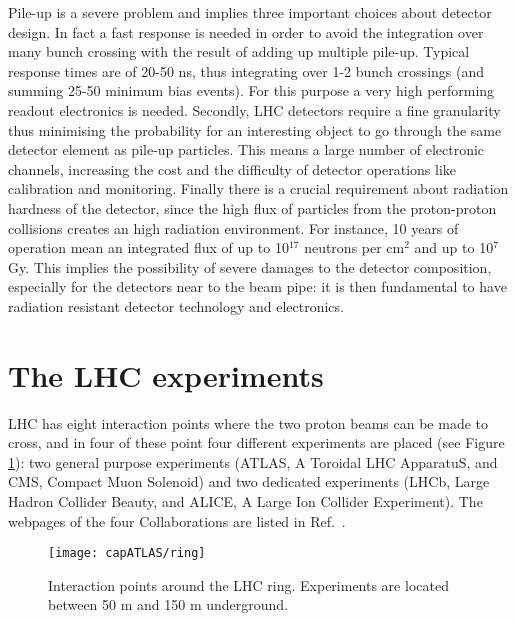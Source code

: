 Pile-up is a severe problem and implies three important choices about detector design. In fact a fast response is needed in order to avoid the integration over many bunch crossing with the result of adding up multiple pile-up. Typical response times are of 20-50 ns, thus integrating over 1-2 bunch crossings (and summing 25-50 minimum bias events). For this purpose a very high performing readout electronics is needed. Secondly, LHC detectors require a fine granularity thus minimising the probability for an interesting object to go through the same detector element as pile-up particles. This means a large number of electronic channels, increasing the cost and the difficulty of detector operations like calibration and monitoring. Finally there is a crucial requirement about radiation hardness of the detector, since the high flux of particles from the proton-proton collisions creates an high radiation environment. For instance, 10 years of operation mean an integrated flux of up to 10$^{17}$ neutrons per cm$^{2}$ and up to 10$^{7}$ Gy. This implies the possibility of severe damages to the detector composition, especially for the detectors near to the beam pipe: it is then fundamental to have radiation resistant detector technology and electronics.

\section{The LHC experiments}
LHC has eight  interaction points where the two proton beams can be made to cross, and in four of these point four different experiments are placed (see Figure \ref{map}): two general purpose experiments (ATLAS, A Toroidal LHC ApparatuS, and CMS, Compact Muon Solenoid) and two dedicated experiments (LHCb, Large Hadron Collider Beauty, and ALICE, A Large Ion Collider Experiment). The webpages of the four Collaborations are listed in Ref.~\cite{webEXP}.
\begin{figure}[htb]\begin{center}
\texttt{[image: capATLAS/ring]}\caption{Interaction points around the LHC ring. Experiments are located between 50 m and 150 m underground.}\label{map}
\end{center}\end{figure}

